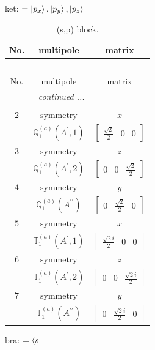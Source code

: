 \documentclass[fleqn,8pt,landscape]{jsarticle}
\begin{document}
\noindent
ket: $=\ket{p_{x}}, \ket{p_{y}}, \ket{p_{z}}$
\renewcommand{\arraystretch}{1.6}
\begin{longtable}{ccc}
\caption{(s,p) block.}
 \\
 \hline \hline
No. & multipole & matrix \\ \hline \endfirsthead

\multicolumn{2}{l}{\tablename\ \thetable{}} \\
 \hline \hline
No. & multipole & matrix \\ \hline \endhead

 \hline \hline
\multicolumn{2}{r}{\footnotesize\it continued ...} \\ \endfoot

 \hline \hline
\multicolumn{2}{r}{} \\ \endlastfoot

$ 2 $ & $ \text{symmetry} $ & $ x $ \\
$  $ & $ \mathbb{Q}_{1}^{(a)}(A^{\prime},1) $ & $ \begin{bmatrix} \frac{\sqrt{2}}{2} & 0 & 0 \end{bmatrix} $ \\ \hline
$ 3 $ & $ \text{symmetry} $ & $ z $ \\
$  $ & $ \mathbb{Q}_{1}^{(a)}(A^{\prime},2) $ & $ \begin{bmatrix} 0 & 0 & \frac{\sqrt{2}}{2} \end{bmatrix} $ \\ \hline
$ 4 $ & $ \text{symmetry} $ & $ y $ \\
$  $ & $ \mathbb{Q}_{1}^{(a)}(A^{\prime\prime}) $ & $ \begin{bmatrix} 0 & \frac{\sqrt{2}}{2} & 0 \end{bmatrix} $ \\ \hline
$ 5 $ & $ \text{symmetry} $ & $ x $ \\
$  $ & $ \mathbb{T}_{1}^{(a)}(A^{\prime},1) $ & $ \begin{bmatrix} \frac{\sqrt{2} i}{2} & 0 & 0 \end{bmatrix} $ \\ \hline
$ 6 $ & $ \text{symmetry} $ & $ z $ \\
$  $ & $ \mathbb{T}_{1}^{(a)}(A^{\prime},2) $ & $ \begin{bmatrix} 0 & 0 & \frac{\sqrt{2} i}{2} \end{bmatrix} $ \\ \hline
$ 7 $ & $ \text{symmetry} $ & $ y $ \\
$  $ & $ \mathbb{T}_{1}^{(a)}(A^{\prime\prime}) $ & $ \begin{bmatrix} 0 & \frac{\sqrt{2} i}{2} & 0 \end{bmatrix} $ \\ \hline
\end{longtable}
bra: $=\bra{s}$
\end{document}
